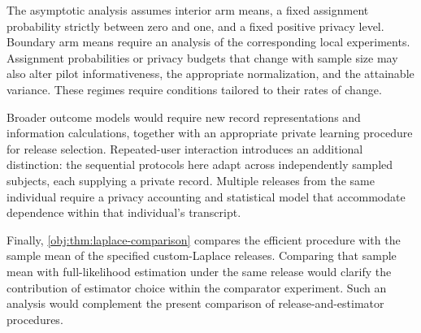 The asymptotic analysis assumes interior arm means, a fixed assignment probability strictly between zero and one, and a fixed positive privacy level. Boundary arm means require an analysis of the corresponding local experiments. Assignment probabilities or privacy budgets that change with sample size may also alter pilot informativeness, the appropriate normalization, and the attainable variance. These regimes require conditions tailored to their rates of change.

Broader outcome models would require new record representations and information calculations, together with an appropriate private learning procedure for release selection. Repeated-user interaction introduces an additional distinction: the sequential protocols here adapt across independently sampled subjects, each supplying a private record. Multiple releases from the same individual require a privacy accounting and statistical model that accommodate dependence within that individual's transcript.

Finally, \cref{obj:thm:laplace-comparison} compares the efficient procedure with the sample mean of the specified custom-Laplace releases. Comparing that sample mean with full-likelihood estimation under the same release would clarify the contribution of estimator choice within the comparator experiment. Such an analysis would complement the present comparison of release-and-estimator procedures.
